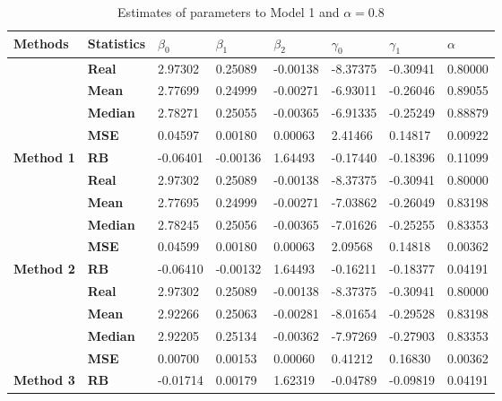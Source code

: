 \begin{table}[h]

\caption{\label{tab:Est_model_1_Alpha0.8}Estimates of parameters to Model 1 and $\alpha=0.8$}
\centering
\begin{tabular}[t]{>{}l>{}lllllll}
\toprule
Methods & Statistics & $\beta_0$ & $\beta_1$ & $\beta_2$ & $\gamma_0$ & $\gamma_1$ & $\alpha$\\
\midrule
 & \textbf{Real} & 2.97302 & 0.25089 & -0.00138 & -8.37375 & -0.30941 & 0.80000\\
\cmidrule{2-8}
 & \textbf{Mean} & 2.77699 & 0.24999 & -0.00271 & -6.93011 & -0.26046 & 0.89055\\
\cmidrule{2-8}
 & \textbf{Median} & 2.78271 & 0.25055 & -0.00365 & -6.91335 & -0.25249 & 0.88879\\
\cmidrule{2-8}
 & \textbf{MSE} & 0.04597 & 0.00180 & 0.00063 & 2.41466 & 0.14817 & 0.00922\\
\cmidrule{2-8}
\multirow{-5}{*}{\raggedright\arraybackslash \textbf{Method 1}} & \textbf{RB} & -0.06401 & -0.00136 & 1.64493 & -0.17440 & -0.18396 & 0.11099\\
\cmidrule{1-8}
 & \textbf{Real} & 2.97302 & 0.25089 & -0.00138 & -8.37375 & -0.30941 & 0.80000\\
\cmidrule{2-8}
 & \textbf{Mean} & 2.77695 & 0.24999 & -0.00271 & -7.03862 & -0.26049 & 0.83198\\
\cmidrule{2-8}
 & \textbf{Median} & 2.78245 & 0.25056 & -0.00365 & -7.01626 & -0.25255 & 0.83353\\
\cmidrule{2-8}
 & \textbf{MSE} & 0.04599 & 0.00180 & 0.00063 & 2.09568 & 0.14818 & 0.00362\\
\cmidrule{2-8}
\multirow{-5}{*}{\raggedright\arraybackslash \textbf{Method 2}} & \textbf{RB} & -0.06410 & -0.00132 & 1.64493 & -0.16211 & -0.18377 & 0.04191\\
\cmidrule{1-8}
 & \textbf{Real} & 2.97302 & 0.25089 & -0.00138 & -8.37375 & -0.30941 & 0.80000\\
\cmidrule{2-8}
 & \textbf{Mean} & 2.92266 & 0.25063 & -0.00281 & -8.01654 & -0.29528 & 0.83198\\
\cmidrule{2-8}
 & \textbf{Median} & 2.92205 & 0.25134 & -0.00362 & -7.97269 & -0.27903 & 0.83353\\
\cmidrule{2-8}
 & \textbf{MSE} & 0.00700 & 0.00153 & 0.00060 & 0.41212 & 0.16830 & 0.00362\\
\cmidrule{2-8}
\multirow{-5}{*}{\raggedright\arraybackslash \textbf{Method 3}} & \textbf{RB} & -0.01714 & 0.00179 & 1.62319 & -0.04789 & -0.09819 & 0.04191\\
\bottomrule
\end{tabular}
\end{table}
